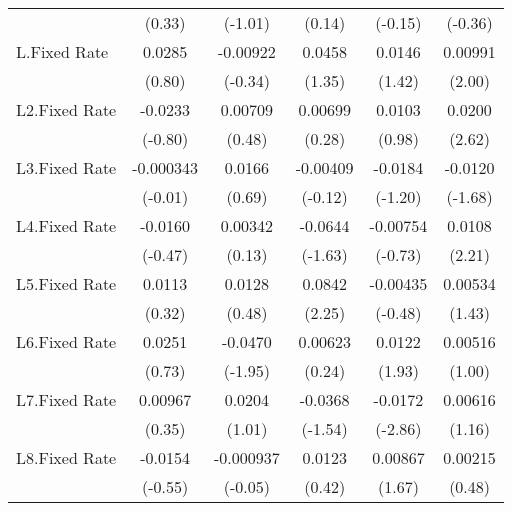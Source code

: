 {\begin{longtable}{l*{5}{c}}
                &   (0.33)         &  (-1.01)         &   (0.14)         &  (-0.15)         &  (-0.36)         \\
[1em]
L.Fixed Rate    &   0.0285         & -0.00922         &   0.0458         &   0.0146         &  0.00991\sym{*}  \\
                &   (0.80)         &  (-0.34)         &   (1.35)         &   (1.42)         &   (2.00)         \\
[1em]
L2.Fixed Rate   &  -0.0233         &  0.00709         &  0.00699         &   0.0103         &   0.0200\sym{**} \\
                &  (-0.80)         &   (0.48)         &   (0.28)         &   (0.98)         &   (2.62)         \\
[1em]
L3.Fixed Rate   &-0.000343         &   0.0166         & -0.00409         &  -0.0184         &  -0.0120         \\
                &  (-0.01)         &   (0.69)         &  (-0.12)         &  (-1.20)         &  (-1.68)         \\
[1em]
L4.Fixed Rate   &  -0.0160         &  0.00342         &  -0.0644         & -0.00754         &   0.0108\sym{*}  \\
                &  (-0.47)         &   (0.13)         &  (-1.63)         &  (-0.73)         &   (2.21)         \\
[1em]
L5.Fixed Rate   &   0.0113         &   0.0128         &   0.0842\sym{*}  & -0.00435         &  0.00534         \\
                &   (0.32)         &   (0.48)         &   (2.25)         &  (-0.48)         &   (1.43)         \\
[1em]
L6.Fixed Rate   &   0.0251         &  -0.0470         &  0.00623         &   0.0122         &  0.00516         \\
                &   (0.73)         &  (-1.95)         &   (0.24)         &   (1.93)         &   (1.00)         \\
[1em]
L7.Fixed Rate   &  0.00967         &   0.0204         &  -0.0368         &  -0.0172\sym{**} &  0.00616         \\
                &   (0.35)         &   (1.01)         &  (-1.54)         &  (-2.86)         &   (1.16)         \\
[1em]
L8.Fixed Rate   &  -0.0154         &-0.000937         &   0.0123         &  0.00867         &  0.00215         \\
                &  (-0.55)         &  (-0.05)         &   (0.42)         &   (1.67)         &   (0.48)         \\

\end{longtable}}
